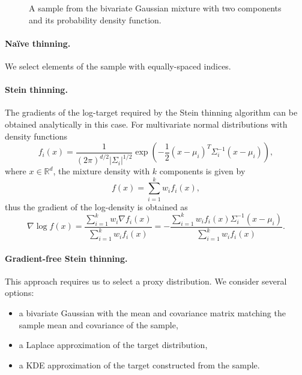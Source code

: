 \documentclass[11pt,a4paper]{report}
\begin{document}
\begin{figure}[h]
\centering
{}
\caption{A sample from the bivariate Gaussian mixture with two components and its probability density function.
\label{fig:gmm:sample}}
\end{figure}

\paragraph{Na\"ive thinning.} We select elements of the sample with equally-spaced indices.

\paragraph{Stein thinning.} The gradients of the log-target required by the Stein thinning algorithm can be obtained analytically in this case. For multivariate normal distributions with density functions
$$f_i(x) = \frac{1}{(2\pi)^{d/2} |\Sigma_i|^{1/2}}\exp\left(-\frac{1}{2}(x - \mu_i)^T \Sigma_i^{-1}(x-\mu_i)\right),$$
where $x \in \mathbb{R}^d$, the mixture density with $k$ components is given by
$$f(x) = \sum_{i=1}^k w_i f_i(x),$$
thus the gradient of the log-density is obtained as
$$\nabla \log f(x) = \frac{\sum_{i=1}^k w_i \nabla f_i(x)}{\sum_{i=1}^k w_i f_i(x)} = -\frac{\sum_{i=1}^k w_i f_i(x) \Sigma_i^{-1}(x - \mu_i)}{\sum_{i=1}^k w_i f_i(x)}.$$

\paragraph{Gradient-free Stein thinning.} This approach requires us to select a proxy distribution. We consider several options:
\begin{itemize}
\item a bivariate Gaussian with the mean and covariance matrix matching the sample mean and covariance of the sample,
\item a Laplace approximation of the target distribution,
\item a KDE approximation of the target constructed from the sample.
\end{itemize}
\end{document}
